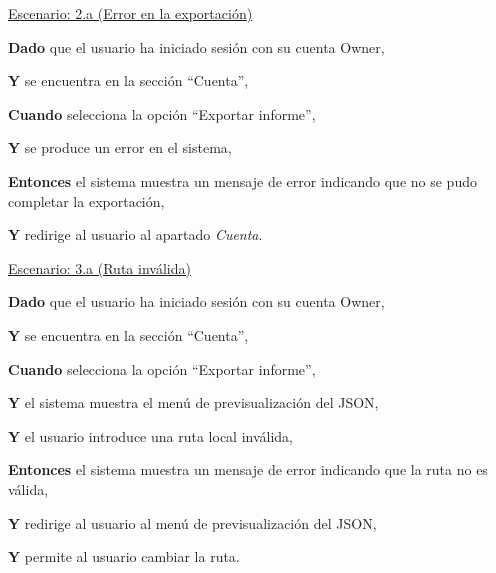 \underline{Escenario: 2.a (Error en la exportación)}\par
\vspace{0.15cm}
\textbf{Dado} que el usuario ha iniciado sesión con su cuenta Owner,\par
\textbf{Y} se encuentra en la sección \enquote{Cuenta},\par
\textbf{Cuando} selecciona la opción \enquote{Exportar informe},\par
\textbf{Y} se produce un error en el sistema,\par
\textbf{Entonces} el sistema muestra un mensaje de error indicando que no se pudo completar la exportación,\par
\textbf{Y} redirige al usuario al apartado \textit{Cuenta}.\par
\vspace{0.20cm}

\underline{Escenario: 3.a (Ruta inválida)}\par
\vspace{0.15cm}
\textbf{Dado} que el usuario ha iniciado sesión con su cuenta Owner,\par
\textbf{Y} se encuentra en la sección \enquote{Cuenta},\par
\textbf{Cuando} selecciona la opción \enquote{Exportar informe},\par
\textbf{Y} el sistema muestra el menú de previsualización del JSON,\par
\textbf{Y} el usuario introduce una ruta local inválida,\par
\textbf{Entonces} el sistema muestra un mensaje de error indicando que la ruta no es válida,\par
\textbf{Y} redirige al usuario al menú de previsualización del JSON,\par
\textbf{Y} permite al usuario cambiar la ruta.\par
\vspace{0.20cm}

\newpage %

